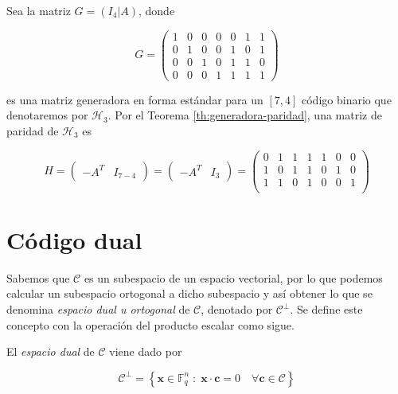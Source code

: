 \begin{exampleth}
    \label{ex:generadora-paridad}
    Sea la matriz $G = \left( I_4 | A \right)$, donde 
    
    \[
        G = \left( 
        \begin{array}{cccc|ccc}  
            1 & 0 & 0 & 0 & 0 & 1 & 1 \\
            0 & 1 & 0 & 0 & 1 & 0 & 1 \\
            0 & 0 & 1 & 0 & 1 & 1 & 0 \\
            0 & 0 & 0 & 1 & 1 & 1 & 1
        \end{array} 
        \right)
    \]

    es una matriz generadora en forma estándar para un $[7, 4]$ código binario que denotaremos por $\mathcal{H}_3$. Por el Teorema \ref{th:generadora-paridad}, una matriz de paridad de $\mathcal{H}_3$ es

    \[ 
        H = 
        \left( 
        \begin{array}{c|c}  
            -A^T & I_{7-4}
        \end{array} 
        \right)
        = 
        \left( 
        \begin{array}{c|c}  
            -A^T & I_{3}
        \end{array} 
        \right)
        =
        \left( 
        \begin{array}{cccc|ccc}  
            0 & 1 & 1 & 1 & 1 & 0 & 0 \\
            1 & 0 & 1 & 1 & 0 & 1 & 0 \\
            1 & 1 & 0 & 1 & 0 & 0 & 1 \\
        \end{array} 
        \right)
    \]
\end{exampleth}

\section{Código dual}

Sabemos que $\mathcal{C}$ es un subespacio de un espacio vectorial, por lo que podemos calcular un subespacio ortogonal a dicho subespacio y así obtener lo que se denomina \emph{espacio dual u ortogonal} de $\mathcal{C}$, denotado por $\mathcal{C} ^{\perp}$. Se define este concepto con la operación del producto escalar como sigue.

\begin{definition}
    El \emph{espacio dual} de $\mathcal{C}$ viene dado por 
    
    $$\mathcal{C} ^{\perp} = \left\{ \mathbf{x} \in \mathbb{F}_q^n \; : \; \mathbf{x} \cdot \mathbf{c} = 0 \quad \forall \mathbf{c} \in \mathcal{C} \right\}$$
\end{definition}

